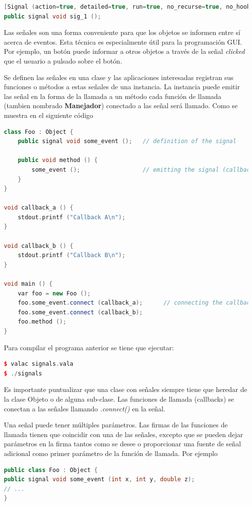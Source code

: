 \documentclass[12pt,twoside]{book}
\begin{document}
\begin{lstlisting}[language=C++]
[Signal (action=true, detailed=true, run=true, no_recurse=true, no_hooks=true)]
public signal void sig_1 ();
\end{lstlisting}


Las señales son una forma conveniente para que los objetos se informen entre sí acerca de eventos. Esta técnica es especialmente útil para la programación GUI. Por ejemplo, un botón puede informar a otros objetos a través de la señal \textit{clicked} que el usuario a pulsado sobre el botón.

Se definen las señales en una clase y las aplicaciones interesadas registran sus funciones o métodos a estas señales de una instancia. La instancia puede emitir las señal en la forma de la llamada a un método cada función de llamada (tambien nombrado \textbf{Manejador}) conectado a las señal será llamado. Como se muestra en el siguiente código

\begin{lstlisting}[language=C++]
class Foo : Object {
	public signal void some_event ();   // definition of the signal

	public void method () {
		some_event ();                  // emitting the signal (callbacks get invoked)
	}
}

void callback_a () {
	stdout.printf ("Callback A\n");
}

void callback_b () {
	stdout.printf ("Callback B\n");
}

void main () {
	var foo = new Foo ();
	foo.some_event.connect (callback_a);      // connecting the callback functions
	foo.some_event.connect (callback_b);
	foo.method ();
}
\end{lstlisting}

Para compilar el programa anterior se tiene que ejecutar:

\begin{lstlisting}[language=C++]
$ valac signals.vala
$ ./signals
\end{lstlisting}

Es importante puntualizar que una clase con señales siempre tiene que heredar de la clase Objeto o de alguna sub-clase. Las funciones de llamada (callbacks) se conectan a las señales llamando \textit{.connect()} en la señal.

Una señal puede tener múltiples parámetros. Las firmas de las funciones de llamada tienen que coincidir con una de las señales, excepto que se pueden dejar parámetros en la firma tantos como se desee o proporcionar una fuente de señal adicional como primer parámetro de la función de llamada. Por ejemplo
\begin{lstlisting}[language=C++]
public class Foo : Object {
public signal void some_event (int x, int y, double z);
// ...
}
\end{lstlisting}
\end{document}
